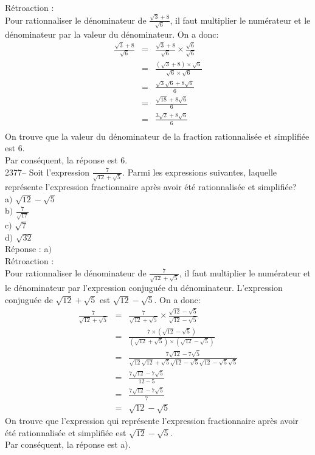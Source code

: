 \documentclass[letterpaper, 12pt]{article}
\begin{document}
R\'etroaction :\\
Pour rationnaliser le d\'enominateur de $\frac{\sqrt{3}+8}{\sqrt{6}}$, il faut multiplier le num\'erateur et le d\'enominateur par la valeur du d\'enominateur. On a donc:
\begin{eqnarray*}
\frac{\sqrt{3}+8}{\sqrt{6}}&=&\frac{\sqrt{3}+8}{\sqrt{6}}\times\frac{\sqrt{6}}{\sqrt{6}}\\[2mm]
&=&\frac{(\sqrt{3}+8)\times \sqrt{6}}{\sqrt{6}\times\sqrt{6}}\\[2mm]
&=&\frac{\sqrt{3}\sqrt{6}+8\sqrt{6}}{6}\\[2mm]
&=&\frac{\sqrt{18}+8\sqrt{6}}{6}\\[2mm]
&=&\frac{3\sqrt{2}+8\sqrt{6}}{6}\\[2mm]
\end{eqnarray*}
On trouve que la valeur du d\'enominateur de la fraction rationnalis\'ee et simplifi\'ee est 6.\\
Par cons\'equent, la r\'eponse est 6.\\

2377-- Soit l'expression $\frac{7}{\sqrt{12}+\sqrt{5}}$. Parmi les expressions suivantes, laquelle repr\'esente l'expression fractionnaire apr\`es avoir \'et\'e rationnalis\'ee et simplifi\'ee?\\

a$)$ $\sqrt{12}-\sqrt{5}$\\[2mm]
b$)$ $\frac{7}{\sqrt{17}}$ \\[2mm]
c$)$ $\sqrt{7}$\\[2mm]
d$)$ $\sqrt{32}$\\

R\'eponse : a$)$\\

R\'etroaction :\\
Pour rationnaliser le d\'enominateur de $\frac{7}{\sqrt{12}+\sqrt{5}}$, il faut multiplier le num\'erateur et le d\'enominateur par l'expression conjugu\'ee du d\'enominateur. L'expression conjugu\'ee de $\sqrt{12}+\sqrt{5}$ est $\sqrt{12}-\sqrt{5}$. On a donc:
\begin{eqnarray*}
\frac{7}{\sqrt{12}+\sqrt{5}}&=&\frac{7}{\sqrt{12}+\sqrt{5}}\times\frac{\sqrt{12}-\sqrt{5}}{\sqrt{12}-\sqrt{5}}\\[2mm]
&=&\frac{7\times(\sqrt{12}-\sqrt{5})}{(\sqrt{12}+\sqrt{5})\times(\sqrt{12}-\sqrt{5})}\\[2mm]
&=&\frac{7\sqrt{12}-7\sqrt{5}}{\sqrt{12}\sqrt{12}+\sqrt{5}\sqrt{12}-\sqrt{5}\sqrt{12}-\sqrt{5}\sqrt{5}}\\[2mm]
&=&\frac{7\sqrt{12}-7\sqrt{5}}{12-5}\\[2mm]
&=&\frac{7\sqrt{12}-7\sqrt{5}}{7}\\[2mm]
&=&\sqrt{12}-\sqrt{5}
\end{eqnarray*}
On trouve que l'expression qui repr\'esente l'expression fractionnaire apr\`es avoir \'et\'e rationnalis\'ee et simplifi\'ee est $\sqrt{12}-\sqrt{5}$.\\
Par cons\'equent, la r\'eponse est a).\\
\end{document}
